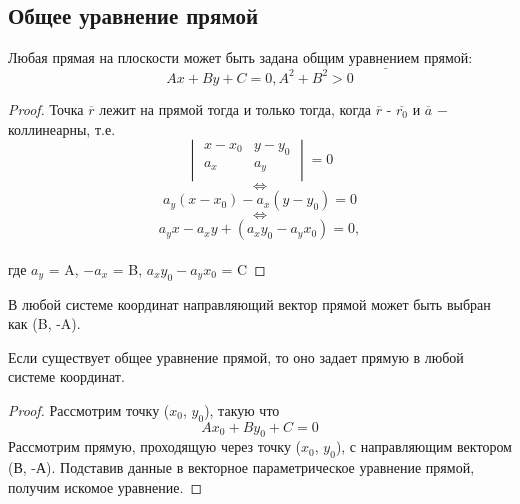 \subsection{Общее уравнение прямой}

\begin{theorem}
    Любая прямая на плоскости может быть задана $\underline{\text{общим уравнением прямой}}$:
    \[
    Ax + By + C = 0, A^2 + B^2 > 0
    \]
\end{theorem}
\begin{proof}
    Точка $\overline{r}$ лежит на прямой тогда и только тогда, когда $\overline{r}$ - $\overline{r_0}$ и $\overline{a}$ $-$ коллинеарны, т.е.
    \[
    \begin{vmatrix}
        x - x_0 & y - y_0\\
        a_x & a_y\\
    \end{vmatrix} = 0
    \]
    \[
    \Longleftrightarrow
    \]
    \[
    a_y(x - x_0) - a_x(y-y_0) = 0
    \]
    \[
    \Longleftrightarrow
    \]
    \[
    a_y x - a_x y +(a_x y_0 - a_y x_0) = 0,
    \]
    \tab\\
    где $a_y$ = A, $- a_x$ = B, $a_x y_0 - a_y x_0$ = C
\end{proof}

\begin{corollary}
    В любой системе координат направляющий вектор прямой может быть выбран как (B, -A).
\end{corollary}

\begin{theorem}
    Если существует общее уравнение прямой, то оно задает прямую в любой системе координат.
\end{theorem}
\begin{proof}
    Рассмотрим точку ($x_0$, $y_0$), такую что
    \[
    Ax_0 + By_0 + C = 0
    \]
    Рассмотрим прямую, проходящую через точку ($x_0$, $y_0$), с направляющим вектором (В, -А). Подставив данные в векторное параметрическое уравнение прямой, получим искомое уравнение.
\end{proof}

